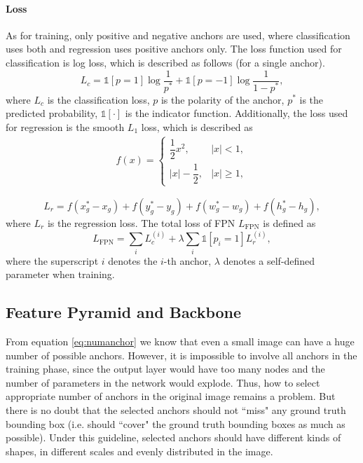 

\paragraph{Loss}
As for training, only positive and negative anchors are used, where classification uses both and regression uses positive anchors only. The loss function used for classification is log loss, which is described as follows (for a single anchor).
\begin{equation}
	L_c = \mathbb{1}[p = 1]\log{\frac{1}{p^*}} + \mathbb{1}[p = -1]\log{\frac{1}{1-p^*}},
\end{equation}
where $L_c$ is the classification loss, $p$ is the polarity of the anchor, $p^*$ is the predicted probability, $\mathbb{1}[\cdot]$ is the indicator function. Additionally, the loss used for regression is the smooth $L_1$ loss, which is described as
\begin{equation}
\begin{aligned}
	f(x) = \begin{cases}
		\dfrac{1}{2}x^2, & \lvert x \rvert < 1, \\
		\lvert x \rvert - \dfrac{1}{2}, & \lvert x \rvert \geqslant 1,
	\end{cases}
\end{aligned}
\end{equation}

\begin{equation}
	L_r = f(x_g^* - x_g) + f(y_g^* - y_g) + f(w_g^* - w_g) + f(h_g^* - h_g),
\end{equation}
where $L_r$ is the regression loss. The total loss of FPN $L_{\text{FPN}}$ is defined as
\begin{equation}
	L_{\text{FPN}} = \sum_{i}^{} L_c^{(i)} + \lambda\sum_{i}^{}\mathbb{1}[p_i = 1]L_r^{(i)},
\end{equation}
where the superscript $i$ denotes the $i$-th anchor, $\lambda$ denotes a self-defined parameter when training.

\subsection{Feature Pyramid and Backbone}\label{fpnbone}

From equation \ref{eq:numanchor} we know that even a small image can have a huge number of possible anchors. However, it is impossible to involve all anchors in the training phase, since the output layer would have too many nodes and the number of parameters in the network would explode. Thus, how to select appropriate number of anchors in the original image remains a problem. But there is no doubt that the selected anchors should not ``miss" any ground truth bounding box (i.e. should ``cover" the ground truth bounding boxes as much as possible). Under this guideline, selected anchors should have different kinds of shapes, in different scales and evenly distributed in the image.

